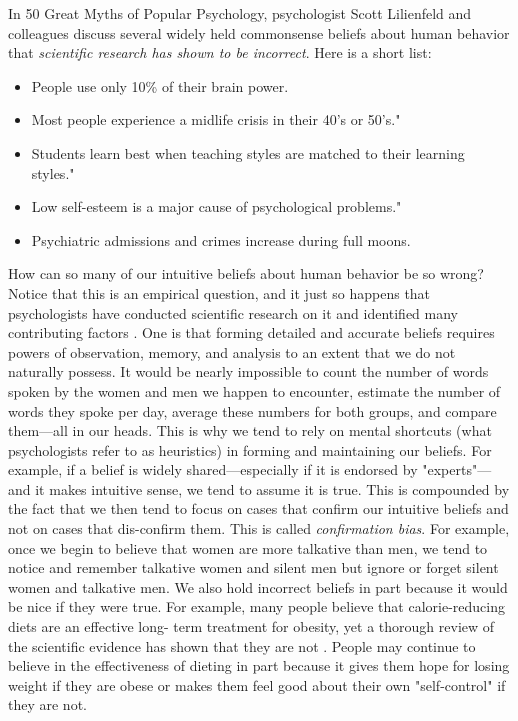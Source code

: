 In 50 Great Myths of Popular Psychology, psychologist Scott Lilienfeld and colleagues \citep{lilienfeld_50_2011} discuss several widely held commonsense beliefs about human behavior that \emph{scientific research has shown to be incorrect}. Here is a short list:

\begin{itemize}
\item People use only 10\% of their brain power.
\item Most people experience a midlife crisis in their 40's or 50's."
\item Students learn best when teaching styles are matched to their learning styles."
\item Low self-esteem is a major cause of psychological problems."
\item Psychiatric admissions and crimes increase during full moons.
\end{itemize}


How can so many of our intuitive beliefs about human behavior be so wrong? Notice that this is an empirical question, and it just so happens that psychologists have conducted scientific research on it and identified many contributing factors \citep{gilovich_how_2008}. One is that forming detailed and accurate beliefs requires powers of observation, memory, and analysis to an extent that we do not naturally possess. It would be nearly impossible to count the number of words spoken by the women and men we happen to encounter, estimate the number of words they spoke per day, average these numbers for both groups, and compare them---all in our heads. This is why we tend to rely on mental shortcuts (what psychologists refer to as heuristics) in forming and maintaining our beliefs. For example, if a belief is widely shared---especially if it is endorsed by "experts"---and it makes intuitive sense, we tend to assume it is true. This is compounded by the fact that we then tend to focus on cases that confirm our intuitive beliefs and not on cases that dis-confirm them. This is called \emph{confirmation bias}. For example, once we begin to believe that women are more talkative than men, we tend to notice and remember talkative women and silent men but ignore or forget silent women and talkative men. We also hold incorrect beliefs in part because it would be nice if they were true. For example, many people believe that calorie-reducing diets are an effective long- term treatment for obesity, yet a thorough review of the scientific evidence has shown that they are not \citep{mann_medicares_2007}. People may continue to believe in the effectiveness of dieting in part because it gives them hope for losing weight if they are obese or makes them feel good about their own "self-control" if they are not.


